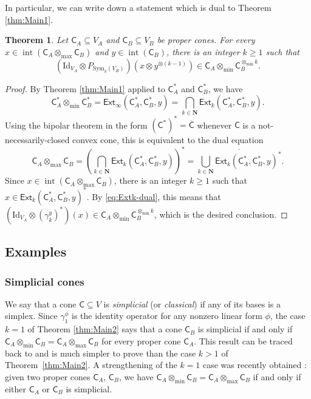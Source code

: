 \documentclass{amsart}
\renewcommand{\geq}{\geqslant}
\renewcommand{\subset}{\subseteq}
\newcommand{\gC}{\mathsf{C}}
\newcommand{\N}{\mathbf{N}}
\newcommand{\Id}{\mathrm{Id}}
\newcommand{\Ext}{\mathsf{Ext}}
\newcommand{\Sym}{\mathrm{Sym}}
\DeclareMathOperator{\inter}{int}
\theoremstyle{plain}
\newtheorem{theorem}{Theorem}
\newcommand{\tmin}{{\otimes_{\min}}}
\newcommand{\tmax}{{\otimes_{\max}}}
\begin{document}
In particular, we can write down a statement which is dual to Theorem \ref{thm:Main1}.

\begin{theorem} \label{theorem:dual}
Let $\gC_A \subset V_A$ and $\gC_B \subset V_B$ be proper cones. For every $x \in \inter (\gC_A \tmax \gC_B)$ and $y \in \inter (\gC_B)$, there is an integer $k \geq 1$ such that 
\[ \left( \Id_{V_A} \otimes P_{\Sym_k(V_B)} \right) (x \otimes y^{\otimes (k-1)}) \in \gC_A \tmin \gC_B^{\tmin k} .\]
\end{theorem}

\begin{proof} 
By Theorem \ref{thm:Main1} applied to $\gC_A^*$ and $\gC_B^*$, we have
\[ \gC_A^* \tmin \gC_B^* = \Ext_{\infty} ( \gC_A^*,\gC_B^*,y) = \bigcap_{k \in \N}
\Ext_k ( \gC_A^*,\gC_B^*,y). \]
Using the bipolar theorem in the form $(\gC^*)^{*}=\overline{\gC}$ whenever $\gC$ is a not-necessarily-closed convex cone, this is equivalent to the dual equation
\[ \gC_A \tmax \gC_B = \left( \bigcap_{k \in \N}
\Ext_k ( \gC_A^*,\gC_B^*,y) \right)^* = \overline{\bigcup_{k \in \N} \Ext_k ( \gC_A^*,\gC_B^*,y)^*}. \]
Since $x \in \inter (\gC_A \tmax \gC_B)$, there is an integer $k \geq 1$ such that $x \in \Ext_k ( \gC_A^*,\gC_B^*,y)^*$. By \eqref{eq:Extk-dual}, this means that $(\Id_{V_A} \otimes (\gamma_k^y)^*)(x) \in \gC_A \tmin \gC_B^{\tmin k}$, which is the desired conclusion.
\end{proof}

\subsection{Examples}\label{sec:Examp}

\subsubsection*{Simplicial cones}

We say that a cone $\gC \subset V$ is \emph{simplicial} (or \emph{classical}) if any of its bases is a simplex. Since $\gamma_1^\phi$ is the identity operator for any nonzero linear form $\phi$, the case $k=1$ of Theorem \ref{thm:Main2} says that a cone $\gC_B$ is simplicial if and only if $\gC_A \tmin \gC_B = \gC_A \tmax \gC_B$ for every proper cone $\gC_A$. This result can be traced back to \cite{NamiokaPhelps69} and is much simpler to prove than the case $k>1$ of Theorem~\ref{thm:Main2}. A strengthening of the $k=1$ case was recently obtained \cite{ALPP21}: given two proper cones $\gC_A$, $\gC_B$, we have $\gC_A \tmin \gC_B = \gC_A \tmax \gC_B$ if and only if either $\gC_A$ or $\gC_B$ is simplicial.
\end{document}
